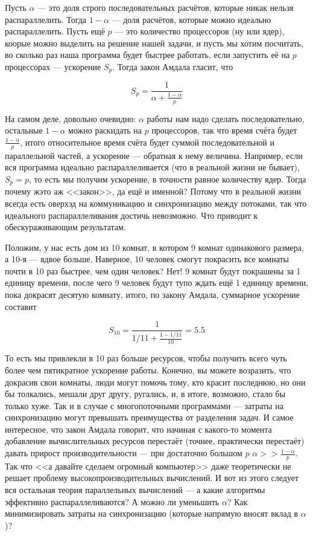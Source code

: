 \documentclass[a5paper]{article}
\begin{document}
Пусть $\alpha$ --- это доля строго последовательных расчётов, которые никак нельзя распараллелить. Тогда $1 - \alpha$ --- доля расчётов, которые можно идеально распараллелить. Пусть ещё $p$ --- это количество процессоров (ну или ядер), коорые можно выделить на решение нашей задачи, и пусть мы хотим посчитать, во сколько раз наша программа будет быстрее работать, если запустить её на $p$ процессорах --- ускорение $S_p$. Тогда закон Амдала гласит, что

$$S_p = \frac{1}{\alpha + \frac{1 - \alpha}{p}}$$

На самом деле, довольно очевидно: $\alpha$ работы нам надо сделать последовательно, остальные $1 - \alpha$ можно раскидать на $p$ процессоров, так что время счёта будет $\frac{1 - \alpha}{p}$, итого относительное время счёта будет суммой последовательной и параллельной частей, а ускорение --- обратная к нему величина. Например, если вся программа идеально распараллеливается (что в реальной жизни не бывает), $S_p = p$, то есть мы получим ускорение, в точности равное количеству ядер. Тогда почему жэто аж <<закон>>, да ещё и именной? Потому что в реальной жизни всегда есть оверхэд на коммуникацию и синхронизацию между потоками, так что идеального распараллеливания достичь невозможно. Что приводит к обескураживающим результатам.

Положим, у нас есть дом из 10 комнат, в котором 9 комнат одинакового размера, а 10-я --- вдвое больше. Наверное, 10 человек смогут покрасить все комнаты почти в 10 раз быстрее, чем один человек? Нет! 9 комнат будут покрашены за 1 единицу времени, после чего 9 человек будут тупо ждать ещё 1 единицу времени, пока докрасят десятую комнату, итого, по закону Амдала, суммарное ускорение составит

$$S_{10} = \frac{1}{1/11 + \frac{1 - 1/11}{10}} = 5.5$$

То есть мы привлекли в 10 раз больше ресурсов, чтобы получить всего чуть более чем пятикратное ускорение работы. Конечно, вы можете возразить, что докрасив свои комнаты, люди могут помочь тому, кто красит последнюю, но они бы толкались, мешали друг другу, ругались, и, в итоге, возможно, стало бы только хуже. Так и в случае с многопоточными программами --- затраты на синхронизацию могут превышать преимущества от разделения задач. И самое интересное, что закон Амдала говорит, что начиная с какого-то момента добавление вычислительных ресурсов перестаёт (точнее, практически перестаёт) давать прирост производительности --- при достаточно большом $p$ $\alpha >> \frac{1 - \alpha}{p}$. Так что <<а давайте сделаем огромный компьютер>> даже теоретически не решает проблему высокопроизводительных вычислений. И вот из этого следует вся остальная теория параллельных вычислений --- а какие алгоритмы эффективно распараллеливаются? А можно ли уменьшить $\alpha$? Как минимизировать затраты на синхронизацию (которые напрямую вносят вклад в $\alpha$)? 
\end{document}
